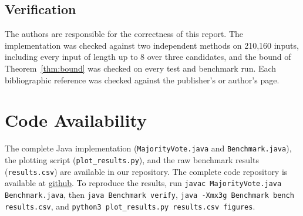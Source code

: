 \documentclass[conference]{IEEEtran}
\begin{document}
\subsection{Verification}

The authors are responsible for the correctness of this report. The
implementation was checked against two independent methods on 210{,}160
inputs, including every input of length up to 8 over three candidates, and the
bound of Theorem~\ref{thm:bound} was checked on every test and benchmark run.
Each bibliographic reference was checked against the publisher's or author's
page.

\section*{Code Availability}

The complete Java implementation (\texttt{MajorityVote.java} and
\texttt{Benchmark.java}), the plotting script (\texttt{plot\_results.py}),
and the raw benchmark results (\texttt{results.csv}) are available in our
repository. The complete code repository is available at
\href{https://github.com/Sridhar-97k/AOA_Project1.git}{github}.
To reproduce the results, run \texttt{javac MajorityVote.java Benchmark.java},
then \texttt{java Benchmark verify}, \texttt{java -Xmx3g Benchmark bench
results.csv}, and \texttt{python3 plot\_results.py results.csv figures}.
\end{document}
